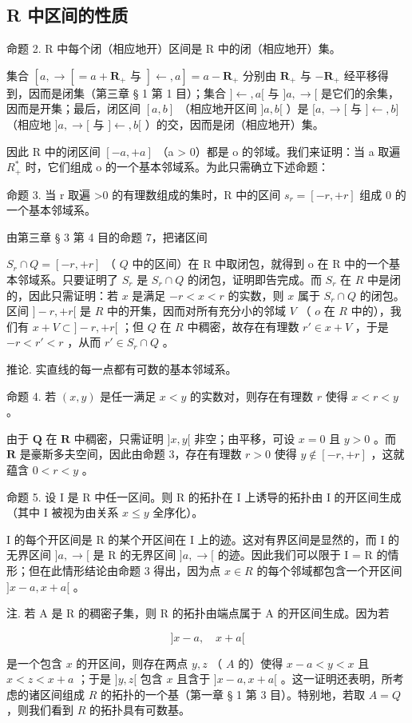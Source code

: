 \subsection{R 中区间的性质}

命题 2. R 中每个闭（相应地开）区间是 R 中的闭（相应地开）集。

集合 \([a, \rightarrow[ = a + \mathbf{R}_+ \text{ 与 } ]\leftarrow, a] = a - \mathbf{R}_+\) 分别由 \(\mathbf{R}_+\) 与 \(-\mathbf{R}_+\) 经平移得到，因而是闭集（第三章 § 1 第 1 目）；集合 \(]\leftarrow, a[\) 与 \(]a, \rightarrow[\) 是它们的余集，因而是开集；最后，闭区间 \([a, b]\) （相应地开区间 \(]a, b[\) ）是 \([a, \rightarrow[\) 与 \(]\leftarrow, b]\) （相应地 \(]a, \rightarrow[\) 与 \(]\leftarrow, b[\) ）的交，因而是闭（相应地开）集。

因此 R 中的闭区间 \([-a, +a]\) （a \textgreater{} 0）都是 o 的邻域。我们来证明：当 a 取遍 \(R_{+}^{*}\) 时，它们组成 o 的一个基本邻域系。为此只需确立下述命题：

命题 3. 当 r 取遍 \textgreater0 的有理数组成的集时，R 中的区间 \(s_{r} = [-r, +r]\) 组成 0 的一个基本邻域系。

由第三章 § 3 第 4 目的命题 7，把诸区间

\(S_{r} \cap Q = [-r, +r]\) （ \(Q\) 中的区间）在 R 中取闭包，就得到 o 在 R 中的一个基本邻域系。只要证明了 \(S_{r}\) 是 \(S_{r} \cap Q\) 的闭包，证明即告完成。而 \(S_{r}\) 在 \(R\) 中是闭的，因此只需证明：若 \(x\) 是满足 \(-r < x < r\) 的实数，则 \(x\) 属于 \(S_{r} \cap Q\) 的闭包。区间 \(]-r, +r[\) 是 \(R\) 中的开集，因而对所有充分小的邻域 \(V\) （ \(o\) 在 \(R\) 中的），我们有 \(x + V \subset ]-r, +r[\) ；但 \(Q\) 在 \(R\) 中稠密，故存在有理数 \(r' \in x + V\) ，于是 \(-r < r' < r\) ，从而 \(r' \in S_{r} \cap Q\) 。

推论. 实直线的每一点都有可数的基本邻域系。

命题 4. 若 \((x, y)\) 是任一满足 \(x < y\) 的实数对，则存在有理数 \(r\) 使得 \(x < r < y\) 。

由于 \(\mathbf{Q}\) 在 \(\mathbf{R}\) 中稠密，只需证明 \(]x, y[\) 非空；由平移，可设 \(x = 0\) 且 \(y > 0\) 。而 \(\mathbf{R}\) 是豪斯多夫空间，因此由命题 3，存在有理数 \(r > 0\) 使得 \(y \notin [-r, +r]\) ，这就蕴含 \(0 < r < y\) 。

命题 5. 设 I 是 R 中任一区间。则 R 的拓扑在 I 上诱导的拓扑由 I 的开区间生成（其中 I 被视为由关系 \(x \leqslant y\) 全序化）。

I 的每个开区间是 R 的某个开区间在 I 上的迹。这对有界区间是显然的，而 I 的无界区间 \(]a, \rightarrow[\) 是 R 的无界区间 \(]a, \rightarrow[\) 的迹。因此我们可以限于 I = R 的情形；但在此情形结论由命题 3 得出，因为点 \(x \in R\) 的每个邻域都包含一个开区间 \(]x - a, x + a[\) 。

注. 若 A 是 R 的稠密子集，则 R 的拓扑由端点属于 A 的开区间生成。因为若

\[
] x - a, \quad x + a [
\]

是一个包含 \(x\) 的开区间，则存在两点 \(y, z\) （ \(A\) 的）使得 \(x - a < y < x\) 且 \(x < z < x + a\) ；于是 \(]y, z[\) 包含 \(x\) 且含于 \(]x - a, x + a[\) 。这一证明还表明，所考虑的诸区间组成 \(R\) 的拓扑的一个基（第一章 § 1 第 3 目）。特别地，若取 \(A = Q\) ，则我们看到 \(R\) 的拓扑具有可数基。

